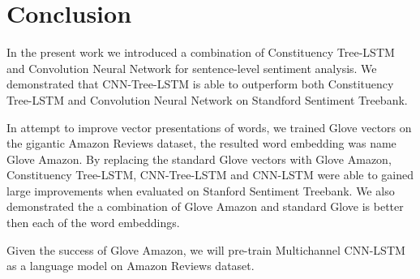 \section{Conclusion}
In the present work we introduced a combination of Constituency Tree-LSTM and Convolution Neural Network for sentence-level sentiment analysis. 
We demonstrated that CNN-Tree-LSTM is able to outperform both Constituency Tree-LSTM and Convolution Neural Network on Standford Sentiment Treebank.

In attempt to improve vector presentations of words, we trained Glove vectors on the gigantic Amazon Reviews dataset, the resulted word embedding was name Glove Amazon.
By replacing the standard Glove vectors with Glove Amazon, Constituency Tree-LSTM, CNN-Tree-LSTM and CNN-LSTM were able to gained large improvements when evaluated on Stanford Sentiment Treebank.
We also demonstrated the a combination of Glove Amazon and standard Glove is better then each of the word embeddings.

Given the success of Glove Amazon, we will pre-train Multichannel CNN-LSTM as a language model on Amazon Reviews dataset.

